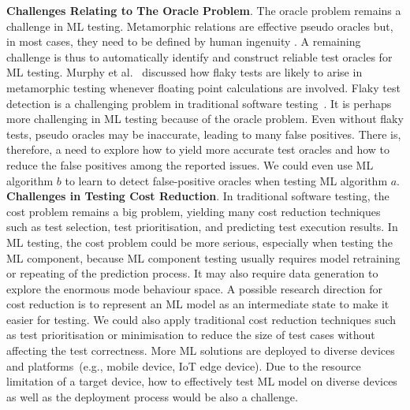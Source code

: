\noindent\textbf{Challenges Relating to The Oracle Problem}.
The oracle problem remains a challenge in ML testing. 
Metamorphic relations are effective pseudo oracles but, in most cases, they need to be defined by human ingenuity . 
A remaining challenge is thus to automatically identify and construct reliable test oracles for ML testing.
Murphy et al.~ discussed how flaky tests are likely to arise in metamorphic testing whenever floating point calculations are involved.
Flaky test detection is a challenging problem in traditional software testing~.
It is perhaps more challenging in ML testing because of the oracle problem.
Even without flaky tests, pseudo oracles may be inaccurate, leading to many false positives.
There is, therefore, a need to explore how to yield more accurate test oracles and how to reduce the false positives among the reported issues.
We could even use ML algorithm $b$ to learn to detect false-positive oracles when testing ML algorithm $a$.
\noindent\textbf{Challenges in Testing Cost Reduction}.
In traditional software testing, the cost problem remains a big problem, yielding many cost reduction techniques such as test selection, test prioritisation, and predicting test execution results. 
In ML testing, the cost problem could be more serious, especially when testing the ML component, because ML component testing usually requires model retraining or repeating of the prediction process. It may also require data generation to explore the enormous mode behaviour space.
A possible research direction for cost reduction is to represent an ML model as an intermediate state to make it easier for testing.
We could also apply traditional cost reduction techniques such as test prioritisation or minimisation to reduce the size of test cases without affecting the test correctness.
More ML solutions are deployed to diverse devices and platforms~(e.g., mobile device, IoT edge device). Due to the resource limitation of a target device, how to effectively test ML model on diverse devices as well as the deployment process would be also a challenge.

